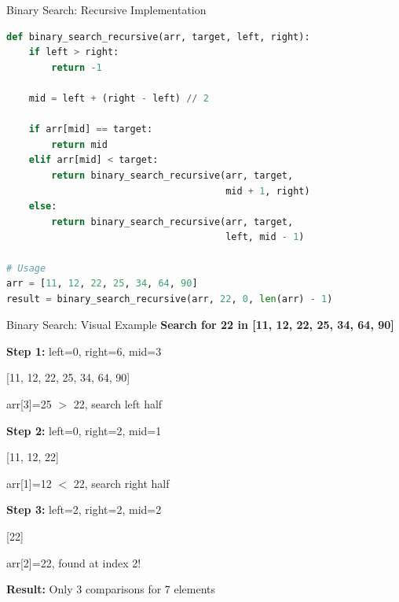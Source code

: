 \documentclass[aspectratio=169]{beamer}
\begin{document}
\begin{frame}[fragile]{Binary Search: Recursive Implementation}
\begin{lstlisting}[language=Python, basicstyle=\ttfamily\small]
def binary_search_recursive(arr, target, left, right):
    if left > right:
        return -1

    mid = left + (right - left) // 2

    if arr[mid] == target:
        return mid
    elif arr[mid] < target:
        return binary_search_recursive(arr, target,
                                       mid + 1, right)
    else:
        return binary_search_recursive(arr, target,
                                       left, mid - 1)

# Usage
arr = [11, 12, 22, 25, 34, 64, 90]
result = binary_search_recursive(arr, 22, 0, len(arr) - 1)
\end{lstlisting}
\end{frame}

\begin{frame}{Binary Search: Visual Example}
  \textbf{Search for 22 in [11, 12, 22, 25, 34, 64, 90]}

  \vspace{0.3cm}
  \textbf{Step 1:} left=0, right=6, mid=3
  \begin{center}
  [11, 12, 22, {\color{red}25}, 34, 64, 90]

  arr[3]=25 $>$ 22, search left half
  \end{center}

  \vspace{0.2cm}
  \textbf{Step 2:} left=0, right=2, mid=1
  \begin{center}
  [11, {\color{red}12}, 22]

  arr[1]=12 $<$ 22, search right half
  \end{center}

  \vspace{0.2cm}
  \textbf{Step 3:} left=2, right=2, mid=2
  \begin{center}
  [{\color{green}22}]

  arr[2]=22, found at index 2!
  \end{center}

  \vspace{0.3cm}
  \textbf{Result:} Only 3 comparisons for 7 elements
\end{frame}
\end{document}
